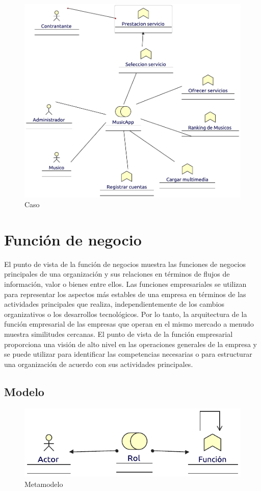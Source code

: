 \begin{figure}[h!]
	\centering
	\includegraphics[width=\linewidth]{Arquitectura/Negocio/imgs/FuncionNegocio.pdf}
	\caption{Caso}
\end{figure}
\newpage

\section{Función de negocio}
El punto de vista de la función de negocios muestra las funciones de negocios principales de una organización y sus relaciones en términos de flujos de información, valor o bienes entre ellos. Las funciones empresariales se utilizan para representar los aspectos más estables de una empresa en términos de las actividades principales que realiza, independientemente de los cambios organizativos o los desarrollos tecnológicos. Por lo tanto, la arquitectura de la función empresarial de las empresas que operan en el mismo mercado a menudo muestra similitudes cercanas. El punto de vista de la función empresarial proporciona una visión de alto nivel en las operaciones generales de la empresa y se puede utilizar para identificar las competencias necesarias o para estructurar una organización de acuerdo con sus actividades principales.
\subsection{Modelo}
\begin{figure}[h!]
	\centering
	\includegraphics[width=0.8\linewidth]{Arquitectura/Negocio/imgs/FuncionNegocioMetamodelo.pdf}
	\caption{Metamodelo}
\end{figure}
\newpage

